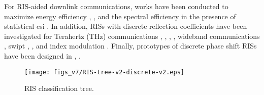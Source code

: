 \documentclass[twocolumn,10pt]{IEEEtran}
\begin{document}
For RIS-aided downlink communications, works have been conducted to maximize energy efficiency \cite{hua18}, \cite{hua19}, and the spectral efficiency in the presence of statistical \gls{csi} \cite{han20}.
In addition, RISs with discrete reflection coefficients have been investigated for Terahertz (THz) communications \cite{ma20a}, \cite{ma20b}, \cite{che19}, \cite{lu20}, wideband communications \cite{cai20}, \gls{swipt} \cite{wu20}, \cite{zha20}, \cite{gon21} and index modulation \cite{liu22}.
Finally, prototypes of discrete phase shift RISs have been designed in \cite{dai20}, \cite{dun20}.

\begin{figure*}[t]
    \centering
    \texttt{[image: figs\_v7/RIS-tree-v2-discrete-v2.eps]}
    \caption{RIS classification tree.}
    \label{fig:ris-tree}
\end{figure*}
\end{document}
